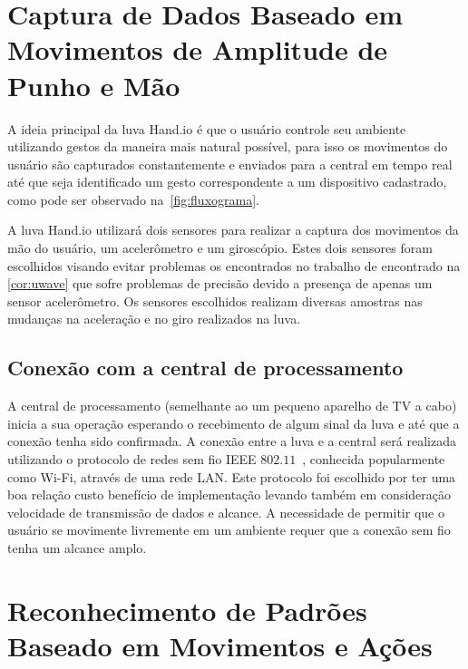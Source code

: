 \section{Captura de Dados Baseado em Movimentos de Amplitude de Punho e Mão}

A ideia principal da luva Hand.io é que o usuário controle seu ambiente utilizando gestos da maneira mais natural possível, para isso os movimentos do usuário são capturados constantemente e enviados para a central em tempo real até que seja identificado um gesto correspondente a um dispositivo cadastrado, como pode ser observado na~\autoref{fig:fluxograma}.

A luva Hand.io utilizará dois sensores para realizar a captura dos movimentos da mão do usuário, um acelerômetro e um giroscópio. Estes dois sensores foram escolhidos visando evitar problemas os encontrados no trabalho de  encontrado na \autoref{cor:uwave} que sofre problemas de precisão devido a presença de apenas um sensor acelerômetro.
% 
Os sensores escolhidos realizam diversas amostras nas mudanças na aceleração e no giro realizados na luva. 



\subsection{Conexão com a central de processamento}

A central de processamento (semelhante ao um pequeno aparelho de TV a cabo) inicia a sua operação esperando o recebimento de algum sinal da luva e até que a conexão tenha sido confirmada.
% 
A conexão entre a luva e a central será realizada utilizando o protocolo de redes sem fio IEEE $802$.$11$~\cite{802.11:1997}, conhecida popularmente como Wi-Fi, através de uma rede LAN. Este protocolo foi escolhido por ter uma boa relação custo benefício de implementação levando também em consideração velocidade de transmissão de dados e alcance. A necessidade de permitir que o usuário se movimente livremente em um ambiente requer que a conexão sem fio tenha um alcance amplo.


\section{Reconhecimento de Padrões Baseado em Movimentos e Ações}

